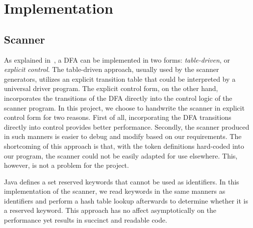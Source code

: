 \chapter{Implementation}

\section{Scanner}

As explained in~\cite{fischer2009crafting}, a DFA can be implemented in two forms: \emph{table-driven}, or \emph{explicit control}. The table-driven approach, usually used by the scanner generators, utilizes an explicit transition table that could be interpreted by a universal driver program. The explicit control form, on the other hand, incorporates the transitions of the DFA directly into the control logic of the scanner program. In this project, we choose to handwrite the scanner in explicit control form for two reasons. First of all, incorporating the DFA transitions directly into control provides better performance. Secondly, the scanner produced in such manners is easier to debug and modify based on our requirements. The shortcoming of this approach is that, with the token definitions hard-coded into our program, the scanner could not be easily adapted for use elsewhere. This, however, is not a problem for the project.

Java defines a set reserved keywords that cannot be used as identifiers. In this implementation of the scanner, we read keywords in the same manners as identifiers and perform a hash table lookup afterwards to determine whether it is a reserved keyword. This approach has no affect asymptotically on the performance yet results in succinct and readable code.

